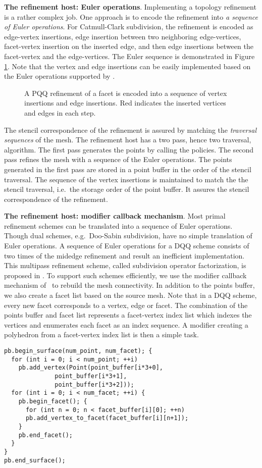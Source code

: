 \noindent\textbf{The refinement host: Euler operations}.
Implementing a topology refinement is a rather complex job. One
approach is to encode the refinement into \emph{a sequence of Euler
operations}. For Catmull-Clark subdivision, the refinement is encoded
as edge-vertex insertions, edge insertion between two neighboring
edge-vertices, facet-vertex insertion on the inserted edge, and then
edge insertions between the facet-vertex and the edge-vertices. 
The Euler sequence is demonstrated in Figure \ref{fig:CCRefinement}. 
Note that the vertex and edge insertions can be easily 
implemented based on the Euler operations supported by \cgalpoly.
\begin{figure}
  \centering
  \caption{A PQQ refinement of a facet is encoded into a sequence of
  vertex insertions and edge insertions. Red indicates the inserted
  vertices and edges in each step.}
  \label{fig:CCRefinement}
\end{figure}

The stencil correspondence of the refinement is assured
by matching the \emph{traversal sequences} of the mesh. 
The refinement host has a two pass, hence two traversal, 
algorithm. The first pass generates the points by 
calling the policies. The second pass
refines the mesh with a sequence of the Euler operations.
The points generated in the first pass are stored in a
point buffer in the order of the stencil 
traversal. The sequence of the vertex insertions 
is maintained to match the the stencil traversal, i.e.\ 
the storage order of the point buffer. It assures 
the stencil correspondence of the refinement.

\noindent\textbf{The refinement host: modifier callback mechanism}.
Most primal refinement schemes can be translated into a sequence of
Euler operations. Though dual schemes, e.g.\ Doo-Sabin subdivision,
have no simple translation of Euler operations. A sequence
of Euler operations for a DQQ scheme consists of two times 
of the midedge refinement \cite{Peters:1997:SSS} and 
result an inefficient implementation. This multipass 
refinement scheme, called subdivision operator factorization, 
is proposed in \cite{Peter:2003:CPDSS}.
To support such schemes efficiently, we use the modifier 
callback mechanism of \cgalpoly\ to rebuild the mesh
connectivity. In addition to the points buffer, we
also create a facet list based on the source mesh. Note that in a DQQ
scheme, every new facet corresponds to a vertex, edge or facet. The
combination of the points buffer and facet list represents a
facet-vertex index list which indexes the vertices and enumerates each
facet as an index sequence. A modifier creating a polyhedron from a
facet-vertex index list is then a simple task.
\begin{lstlisting}
pb.begin_surface(num_point, num_facet); {
  for (int i = 0; i < num_point; ++i) 
    pb.add_vertex(Point(point_buffer[i*3+0], 
	          point_buffer[i*3+1], 
	          point_buffer[i*3+2]));	
  for (int i = 0; i < num_facet; ++i) {
    pb.begin_facet(); {
      for (int n = 0; n < facet_buffer[i][0]; ++n)
      pb.add_vertex_to_facet(facet_buffer[i][n+1]);
    }
    pb.end_facet();
  }
}
pb.end_surface();
\end{lstlisting}


